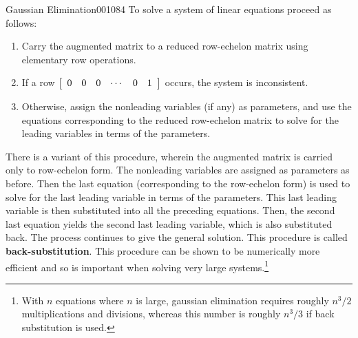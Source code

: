 \begin{theorem*}{Gaussian Elimination}{001084}
To solve a system of linear equations proceed as follows:

\begin{enumerate}
\item Carry the augmented matrix to a reduced row-echelon matrix using elementary row operations.

\item If a row $\left[ \begin{array}{cccccc}
0 & 0 & 0 & \cdots & 0 & 1
\end{array} \right]$ occurs, the system is inconsistent.

\item Otherwise, assign the nonleading variables (if any) as parameters, and use the equations corresponding to the reduced row-echelon matrix to solve for the leading variables in terms of the parameters.

\end{enumerate}
\end{theorem*}

There is a variant of this procedure, wherein the augmented matrix is carried only to row-echelon form. The nonleading variables are assigned as parameters as before. Then the last equation (corresponding to the row-echelon form) is used to solve for the last leading variable in terms of the parameters. This last leading variable is then substituted into all the preceding equations. Then, the second last equation yields the second last leading variable, which is also substituted back. The process continues to give the general solution. This procedure is called \textbf{back-substitution}. This procedure can be shown to be numerically more efficient and so is important when solving very large systems.\footnote{With $n$ equations where $n$ is large, gaussian elimination requires roughly $n^3/2$ multiplications and divisions, whereas this number is roughly $n^3/3$ if back substitution is used.}

